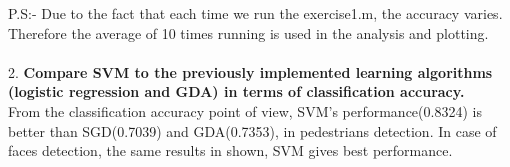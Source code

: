 \documentclass[12pt]{article}
\begin{document}
	\noindent
	P.S:- Due to the fact that each time we run the exercise1.m, the accuracy varies. Therefore the average of 10 times running is used in the analysis and plotting.\\
	\\
	2. \textbf{Compare SVM to the previously implemented learning algorithms (logistic regression and GDA) in terms of classification accuracy.}\\
	From the classification accuracy point of view, SVM's performance(0.8324) is better than SGD(0.7039) and GDA(0.7353), in pedestrians detection. In case of faces detection, the same results in shown, SVM gives best performance.\\
	
\end{document}
